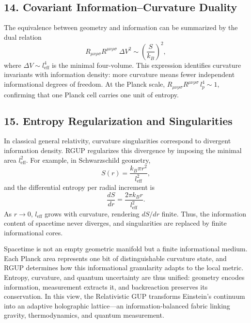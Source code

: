 \documentclass[11pt,oneside]{book}
\newenvironment{booknote}{
  \begin{tcolorbox}[
    colback=gray!3!white,
    colframe=gray!45!black,
    fonttitle=\bfseries,
    title=\textbf{Book Note},
  ]
}{\end{tcolorbox}}
\numberwithin{equation}{chapter}
\begin{document}
\subsection*{14. Covariant Information–Curvature Duality}

The equivalence between geometry and information can be summarized by the dual relation
\begin{equation}
R_{\mu\nu\rho\sigma} R^{\mu\nu\rho\sigma}
\;\Delta V^2
\sim
\left(\frac{S}{k_B}\right)^2,
\end{equation}
where $\Delta V \sim l_{\text{eff}}^4$ is the minimal four-volume.  
This expression identifies curvature invariants with information density: more curvature means fewer independent informational degrees of freedom.  
At the Planck scale, $R_{\mu\nu\rho\sigma}R^{\mu\nu\rho\sigma}\,l_p^4\sim1$, confirming that one Planck cell carries one unit of entropy.

\subsection*{15. Entropy Regularization and Singularities}

In classical general relativity, curvature singularities correspond to divergent information density.  
RGUP regularizes this divergence by imposing the minimal area $l_{\text{eff}}^2$.  
For example, in Schwarzschild geometry,
\begin{equation}
S(r) = \frac{k_B \pi r^2}{l_{\text{eff}}^2},
\end{equation}
and the differential entropy per radial increment is
\begin{equation}
\frac{dS}{dr} = \frac{2\pi k_B r}{l_{\text{eff}}^2}.
\end{equation}
As $r\to0$, $l_{\text{eff}}$ grows with curvature, rendering $dS/dr$ finite.  
Thus, the information content of spacetime never diverges, and singularities are replaced by finite informational cores. \vspace{0.8em}

\begin{booknote}
Spacetime is not an empty geometric manifold but a finite informational medium.  
Each Planck area represents one bit of distinguishable curvature state, and RGUP determines how this informational granularity adapts to the local metric.  
Entropy, curvature, and quantum uncertainty are thus unified: geometry encodes information, measurement extracts it, and backreaction preserves its conservation.  
In this view, the Relativistic GUP transforms Einstein’s continuum into an adaptive holographic lattice—an information-balanced fabric linking gravity, thermodynamics, and quantum measurement.
\end{booknote}
\end{document}
